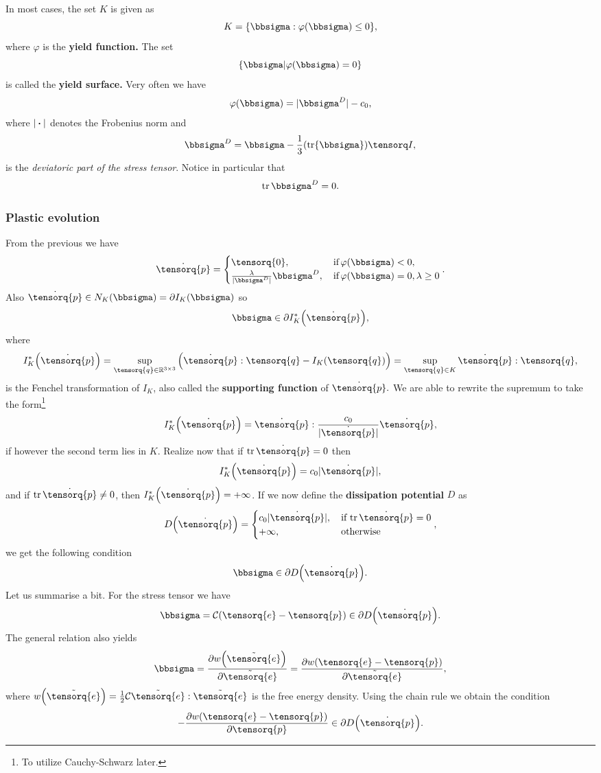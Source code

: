 \documentclass[11pt]{scrartcl} %
\begin{document}
In most cases, the set $K$ is given as
\[
	K = \qty{ \bbsigma:\varphi\qty(\bbsigma) \leq 0},
\]
where $\varphi$ is the \textbf{yield function.} The set
\[
	\qty{\bbsigma| \varphi\qty(\bbsigma) = 0}
\]
is called the \textbf{yield surface.} Very often we have
\[
	\varphi\qty(\bbsigma) = |\bbsigma^D|-c_0,
\]
where $| \vdot |$ denotes the Frobenius norm and
\[
	\bbsigma^D = \bbsigma - \frac{1}{3}\qty(\tr \bbsigma)\identity,
\]
is the \textit{deviatoric part of the stress tensor}. Notice in particular that
\[
	\trace \bbsigma^D = 0.
\]


\subsubsection{Plastic evolution}
\label{sec:plastic_evolution}

From the previous we have
\[
	\dot{\tensorq{p}} = \begin{cases}
		\tensorq{0}, & \, \text{if} \, \varphi\qty(\bbsigma)<0, \\
		\frac{\lambda}{|\bbsigma^D|}\bbsigma^D, & \, \text{if} \, \varphi\qty(\bbsigma) = 0, \lambda \geq 0
	\end{cases}.
\]
Also $\dot{\tensorq{p}} \in N_K\qty(\bbsigma) = \partial I_K\qty(\bbsigma)$ so
\[
	\bbsigma \in \partial I_K^{*}\qty(\dot{\tensorq{p}}),
\]
where 
\[
	I_K^{*}\qty(\dot{\tensorq{p}}) = \sup_{\tensorq{q}\in \R^{3 \times 3}}\qty(\dot{\tensorq{p}}: \tensorq{q}- I_K\qty(\tensorq{q})) = \sup_{\tensorq{q}\in K}\dot{\tensorq{p}}: \tensorq{q},
\]
is the Fenchel transformation of $I_K$, also called the \textbf{supporting function} of $\dot{\tensorq{p}}.$ We are able to rewrite the supremum to take the form\footnote{To utilize Cauchy-Schwarz later.}
\[
	I_K^{*}\qty(\dot{\tensorq{p}}) = \dot{\tensorq{p}} : \frac{c_0}{|\dot{\tensorq{p}}|}\dot{\tensorq{p}},
\]
if however the second term lies in $K$. Realize now that if $\tr \dot{\tensorq{p}} = 0$ then
\[
	I_K^{*}\qty(\dot{\tensorq{p}}) = c_0 |\dot{\tensorq{p}}|,
\]
and if $\tr \dot{\tensorq{p}} \neq 0$, then $I_K^{*}\qty(\dot{\tensorq{p}})= + \infty$. If we now define the \textbf{dissipation potential} $D$ as
\[
	D\qty(\dot{\tensorq{p}}) = \begin{cases}
		c_0 |\dot{\tensorq{p}}|, & \, \text{if} \, \tr \dot{\tensorq{p}} = 0 \\
		+ \infty, & \, \text{otherwise} \,
	\end{cases},
\]
we get the following condition
\[
	\bbsigma \in \partial D\qty(\dot{\tensorq{p}}).
\]
Let us summarise a bit. For the stress tensor we have
\[
	\bbsigma = \mathcal{C}\qty(\tensorq{e}-\tensorq{p}) \in \partial D\qty(\dot{\tensorq{p}}).
\]
The general relation also yields
\[
	\bbsigma= \pdv{w\qty(\tilde{\tensorq{e}})}{\tilde{\tensorq{e}}} = \pdv{w\qty(\tensorq{e}-\tensorq{p})}{\tilde{\tensorq{e}}},
\]
where $w\qty(\tilde{\tensorq{e}}) = \frac{1}{2}\mathcal{C} \tilde{\tensorq{e}}: \tilde{\tensorq{e}}$ is the free energy density. Using the chain rule we obtain the condition
\[
	-\pdv{w\qty(\tensorq{e}-\tensorq{p})}{\tensorq{p}} \in \partial D\qty(\dot{\tensorq{p}}).
\]
\end{document}
